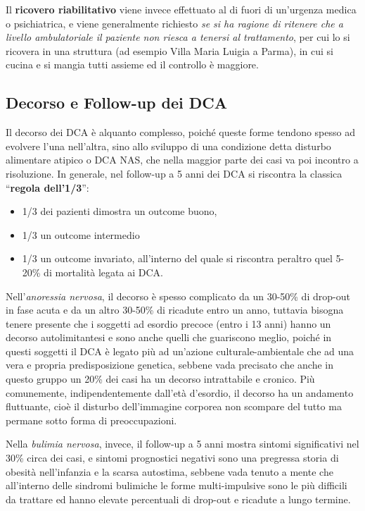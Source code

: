 Il \textbf{ricovero riabilitativo} viene invece effettuato al di fuori
di un'urgenza medica o psichiatrica, e viene generalmente richiesto
\emph{se si ha ragione di ritenere che a livello ambulatoriale il
paziente non riesca a tenersi al trattamento}, per cui lo si ricovera in
una struttura (ad esempio Villa Maria Luigia a Parma), in cui si cucina
e si mangia tutti assieme ed il controllo è maggiore.

\subsection{Decorso e Follow-up dei DCA}

Il decorso dei DCA è alquanto complesso, poiché queste forme tendono
spesso ad evolvere l'una nell'altra, sino allo sviluppo di una
condizione detta disturbo alimentare atipico o DCA NAS, che nella
maggior parte dei casi va poi incontro a risoluzione. In generale, nel
follow-up a 5 anni dei DCA si riscontra la classica ``\textbf{regola
dell'1/3}'':

\begin{itemize}
\item
  1/3 dei pazienti dimostra un outcome buono,
\item
  1/3 un outcome intermedio
\item
  1/3 un outcome invariato, all'interno del quale si riscontra peraltro
  quel 5-20\% di mortalità legata ai DCA.
\end{itemize}

Nell'\emph{anoressia nervosa}, il decorso è spesso complicato da un
30-50\% di drop-out in fase acuta e da un altro 30-50\% di ricadute
entro un anno, tuttavia bisogna tenere presente che i soggetti ad
esordio precoce (entro i 13 anni) hanno un decorso autolimitantesi e
sono anche quelli che guariscono meglio, poiché in questi soggetti il
DCA è legato più ad un'azione culturale-ambientale che ad una vera e
propria predisposizione genetica, sebbene vada precisato che anche in
questo gruppo un 20\% dei casi ha un decorso intrattabile e cronico. Più
comunemente, indipendentemente dall'età d'esordio, il decorso ha un
andamento fluttuante, cioè il disturbo dell'immagine corporea non
scompare del tutto ma permane sotto forma di preoccupazioni.

Nella \emph{bulimia nervosa}, invece, il follow-up a 5 anni mostra
sintomi significativi nel 30\% circa dei casi, e sintomi prognostici
negativi sono una pregressa storia di obesità nell'infanzia e la scarsa
autostima, sebbene vada tenuto a mente che all'interno delle sindromi
bulimiche le forme multi-impulsive sono le più difficili da trattare ed
hanno elevate percentuali di drop-out e ricadute a lungo termine.
